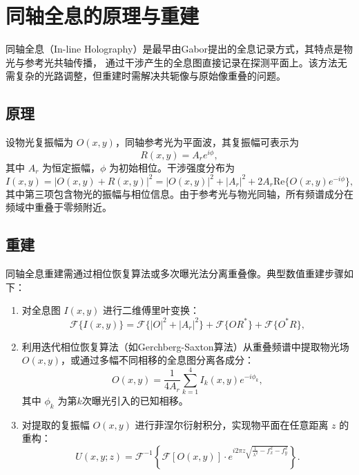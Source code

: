 \documentclass[a4paper,draft]{report}
\begin{document}
\section{同轴全息的原理与重建}
同轴全息（In-line Holography）是最早由Gabor提出的全息记录方式，其特点是物光与参考光共轴传播，
通过干涉产生的全息图直接记录在探测平面上。该方法无需复杂的光路调整，但重建时需解决共轭像与原始像重叠的问题。
\subsection{原理}
设物光复振幅为 $O(x,y)$，同轴参考光为平面波，其复振幅可表示为
\begin{equation}
R(x,y) = A_r e^{i\phi},
\end{equation}
其中 $A_r$ 为恒定振幅，$\phi$ 为初始相位。干涉强度分布为
\begin{equation}
I(x,y) = |O(x,y) + R(x,y)|^2 = |O(x,y)|^2 + |A_r|^2 + 2A_r \text{Re}\{O(x,y)e^{-i\phi}\},
\end{equation}
其中第三项包含物光的振幅与相位信息。由于参考光与物光同轴，所有频谱成分在频域中重叠于零频附近。

\subsection{重建}
同轴全息重建需通过相位恢复算法或多次曝光法分离重叠像。典型数值重建步骤如下\cite{shuzi2}：
\begin{enumerate}
    \item 对全息图 $I(x,y)$ 进行二维傅里叶变换：
    \begin{equation}
    \mathcal{F}\{I(x,y)\} = \mathcal{F}\{|O|^2 + |A_r|^2\} + \mathcal{F}\{O R^*\} + \mathcal{F}\{O^* R\},
    \end{equation}
    
    \item 利用迭代相位恢复算法（如Gerchberg-Saxton算法）从重叠频谱中提取物光场 $O(x,y)$，或通过多幅不同相移的全息图分离各成分：
    \begin{equation}
    O(x,y) = \frac{1}{4A_r}\sum_{k=1}^4 I_k(x,y) e^{-i\phi_k},
    \end{equation}
    其中 $\phi_k$ 为第$k$次曝光引入的已知相移。
    
    \item 对提取的复振幅 $O(x,y)$ 进行菲涅尔衍射积分，实现物平面在任意距离 $z$ 的重构：
    \begin{equation}
    U(x,y;z) = \mathcal{F}^{-1} \left\{ \mathcal{F}[O(x,y)] \cdot e^{i 2\pi z \sqrt{\frac{1}{\lambda^2} - f_x^2 - f_y^2}} \right\}.
    \end{equation}
\end{enumerate}
\end{document}
